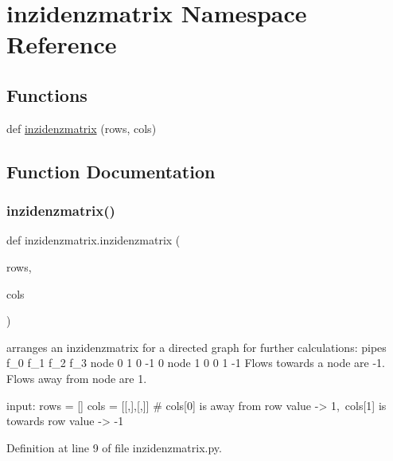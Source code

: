 \hypertarget{namespaceinzidenzmatrix}{}\section{inzidenzmatrix Namespace Reference}
\label{namespaceinzidenzmatrix}
\subsection*{Functions}
\begin{DoxyCompactItemize}
\item 
def \hyperlink{namespaceinzidenzmatrix_ad398eea62599230217b3179258dc262c}{inzidenzmatrix} (rows, cols)
\end{DoxyCompactItemize}


\subsection{Function Documentation}
\mbox{\label{namespaceinzidenzmatrix_ad398eea62599230217b3179258dc262c}} 
\subsubsection{\texorpdfstring{inzidenzmatrix()}{inzidenzmatrix()}}
{\footnotesize\ttfamily def inzidenzmatrix.\+inzidenzmatrix (\begin{DoxyParamCaption}\item[{}]{rows,  }\item[{}]{cols }\end{DoxyParamCaption})}

\begin{DoxyVerb}arranges an inzidenzmatrix for a directed graph for further
calculations:
            pipes
            f_0  f_1  f_2  f_3
    node 0   1    0    -1   0
    node 1   0    0    1   -1
Flows towards a node are -1. Flows away from node are 1.

input:
    rows = []
    cols = [[,],[,]] # cols[0] is away from row value -> 1,\
                        cols[1] is towards row value -> -1
\end{DoxyVerb}
 

Definition at line 9 of file inzidenzmatrix.\+py.

